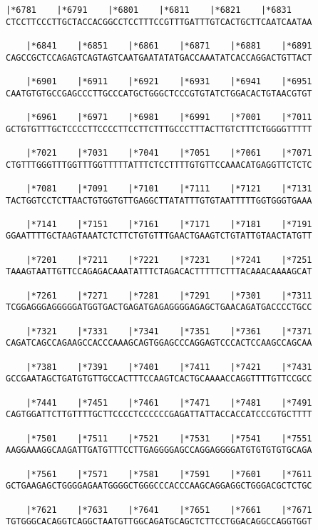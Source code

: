 \documentclass{article}
\begin{document}
\begin{Verbatim}[fontfamily=courier]
    |*6781    |*6791    |*6801    |*6811    |*6821    |*6831
CTCCTTCCCTTGCTACCACGGCCTCCTTTCCGTTTGATTTGTCACTGCTTCAATCAATAA

    |*6841    |*6851    |*6861    |*6871    |*6881    |*6891
CAGCCGCTCCAGAGTCAGTAGTCAATGAATATATGACCAAATATCACCAGGACTGTTACT

    |*6901    |*6911    |*6921    |*6931    |*6941    |*6951
CAATGTGTGCCGAGCCCTTGCCCATGCTGGGCTCCCGTGTATCTGGACACTGTAACGTGT

    |*6961    |*6971    |*6981    |*6991    |*7001    |*7011
GCTGTGTTTGCTCCCCTTCCCCTTCCTTCTTTGCCCTTTACTTGTCTTTCTGGGGTTTTT

    |*7021    |*7031    |*7041    |*7051    |*7061    |*7071
CTGTTTGGGTTTGGTTTGGTTTTTATTTCTCCTTTTGTGTTCCAAACATGAGGTTCTCTC

    |*7081    |*7091    |*7101    |*7111    |*7121    |*7131
TACTGGTCCTCTTAACTGTGGTGTTGAGGCTTATATTTGTGTAATTTTTGGTGGGTGAAA

    |*7141    |*7151    |*7161    |*7171    |*7181    |*7191
GGAATTTTGCTAAGTAAATCTCTTCTGTGTTTGAACTGAAGTCTGTATTGTAACTATGTT

    |*7201    |*7211    |*7221    |*7231    |*7241    |*7251
TAAAGTAATTGTTCCAGAGACAAATATTTCTAGACACTTTTTCTTTACAAACAAAAGCAT

    |*7261    |*7271    |*7281    |*7291    |*7301    |*7311
TCGGAGGGAGGGGGATGGTGACTGAGATGAGAGGGGAGAGCTGAACAGATGACCCCTGCC

    |*7321    |*7331    |*7341    |*7351    |*7361    |*7371
CAGATCAGCCAGAAGCCACCCAAAGCAGTGGAGCCCAGGAGTCCCACTCCAAGCCAGCAA

    |*7381    |*7391    |*7401    |*7411    |*7421    |*7431
GCCGAATAGCTGATGTGTTGCCACTTTCCAAGTCACTGCAAAACCAGGTTTTGTTCCGCC

    |*7441    |*7451    |*7461    |*7471    |*7481    |*7491
CAGTGGATTCTTGTTTTGCTTCCCCTCCCCCCGAGATTATTACCACCATCCCGTGCTTTT

    |*7501    |*7511    |*7521    |*7531    |*7541    |*7551
AAGGAAAGGCAAGATTGATGTTTCCTTGAGGGGAGCCAGGAGGGGATGTGTGTGTGCAGA

    |*7561    |*7571    |*7581    |*7591    |*7601    |*7611
GCTGAAGAGCTGGGGAGAATGGGGCTGGGCCCACCCAAGCAGGAGGCTGGGACGCTCTGC

    |*7621    |*7631    |*7641    |*7651    |*7661    |*7671
TGTGGGCACAGGTCAGGCTAATGTTGGCAGATGCAGCTCTTCCTGGACAGGCCAGGTGGT

\end{Verbatim}
\newpage
\end{document}
